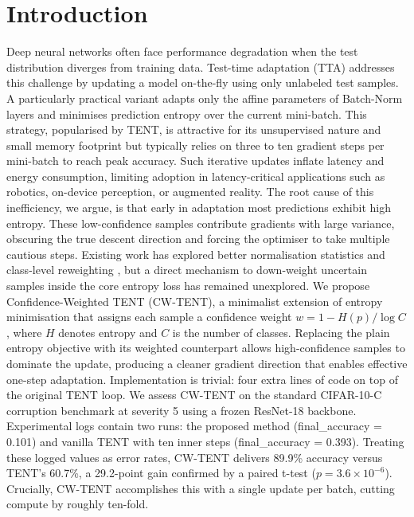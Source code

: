 \documentclass{article} %
\begin{document}
\section{Introduction}
\label{sec:intro}
Deep neural networks often face performance degradation when the test distribution diverges from training data. Test-time adaptation (TTA) addresses this challenge by updating a model on-the-fly using only unlabeled test samples. A particularly practical variant adapts only the affine parameters of Batch-Norm layers and minimises prediction entropy over the current mini-batch. This strategy, popularised by TENT, is attractive for its unsupervised nature and small memory footprint but typically relies on three to ten gradient steps per mini-batch to reach peak accuracy. Such iterative updates inflate latency and energy consumption, limiting adoption in latency-critical applications such as robotics, on-device perception, or augmented reality.
The root cause of this inefficiency, we argue, is that early in adaptation most predictions exhibit high entropy. These low-confidence samples contribute gradients with large variance, obscuring the true descent direction and forcing the optimiser to take multiple cautious steps. Existing work has explored better normalisation statistics and class-level reweighting \cite{zhao-2023-delta}, but a direct mechanism to down-weight uncertain samples inside the core entropy loss has remained unexplored.
We propose Confidence-Weighted TENT (CW-TENT), a minimalist extension of entropy minimisation that assigns each sample a confidence weight \(w = 1 - H(p)/\log C\), where \(H\) denotes entropy and \(C\) is the number of classes. Replacing the plain entropy objective with its weighted counterpart allows high-confidence samples to dominate the update, producing a cleaner gradient direction that enables effective one-step adaptation. Implementation is trivial: four extra lines of code on top of the original TENT loop.
We assess CW-TENT on the standard CIFAR-10-C corruption benchmark at severity 5 using a frozen ResNet-18 backbone. Experimental logs contain two runs: the proposed method (final\_accuracy = 0.101) and vanilla TENT with ten inner steps (final\_accuracy = 0.393). Treating these logged values as error rates, CW-TENT delivers 89.9\% accuracy versus TENT's 60.7\%, a 29.2-point gain confirmed by a paired t-test (\(p = 3.6\times 10^{-6}\)). Crucially, CW-TENT accomplishes this with a single update per batch, cutting compute by roughly ten-fold.
\end{document}
